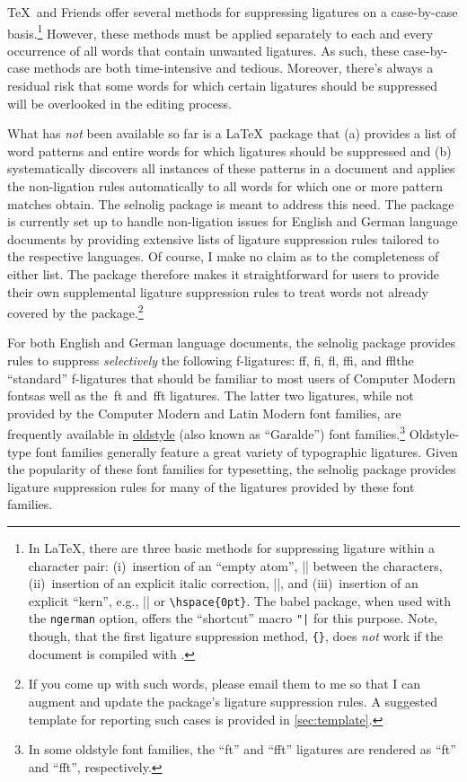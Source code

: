 \documentclass[11pt]{article}
\newcommand{\pkg}[1]{\textsf{#1}}
\newcommand{\opt}[1]{\texttt{#1}}
\begin{document}
\TeX\ and Friends offer several methods for suppressing ligatures on a case-by-case basis.\footnote{In \LaTeX, there are three basic methods for suppressing ligature within a character pair: (i)~insertion of an \enquote{empty atom}, |{}| between the characters, (ii)~insertion of an explicit italic correction, |\/|, and (iii)~insertion of an explicit \enquote{kern}, e.g., |\kern0pt| or \Verb/\hspace{0pt}/. The \pkg{babel} package, when used with the \opt{ngerman} option, offers the \enquote{shortcut} macro \Verb/"|/ for this purpose. Note, though, that the first ligature suppression method, \Verb/{}/, does \emph{not} work if the document is compiled with \LuaLaTeX.} However, these methods must be applied separately to each and every occurrence of all words that contain unwanted ligatures. As such, these case-by-case methods are both time-intensive and tedious. Moreover, there's always a residual risk that some words for which certain ligatures should be suppressed will be overlooked in the editing process. 

What has \emph{not} been available so far is a \LaTeX\ package that (a) provides a list of word patterns and entire words for which ligatures should be suppressed and (b) systematically discovers all instances of these patterns in a document and applies the non-ligation rules automatically to all words for which one or more pattern matches obtain. The \pkg{selnolig} package is meant to address this need. The package is currently set up to handle non-ligation issues for English and German language documents by providing extensive lists of ligature suppression rules tailored to the respective languages. Of course, I make no claim as to the completeness of either list. The package therefore makes it straightforward for users to provide their own supplemental ligature suppression rules to treat words not already covered by the package.\footnote{If you come up with such words, please email them to me so that I can augment and update the package's ligature suppression rules. A suggested template for reporting such cases is provided in \cref{sec:template}.} 

For both English and German language documents, the \pkg{selnolig} package provides rules to suppress \emph{selectively} the following f-ligatures: ff, fi, fl, ffi, and ffl\textemdash the \enquote{standard} f-ligatures that should be familiar to most users of Computer Modern fonts\textemdash as well as the~ft and~fft ligatures. The latter two ligatures, while not provided by the Computer Modern and Latin Modern font families, are frequently available in \href{http://en.wikipedia.org/wiki/Serif#Old_Style}{oldstyle} (also known as \enquote{Garalde}) font families.\footnote{In some oldstyle font families, the \enquote{ft} and \enquote{fft} ligatures are rendered as \enquote{\sabon ft} and \enquote{\sabon fft}, respectively.} Oldstyle-type font families generally feature a great variety of typographic ligatures. Given the popularity of these font families for typesetting, the \pkg{selnolig} package provides ligature suppression rules for many of the ligatures provided by these font families.
\end{document}
